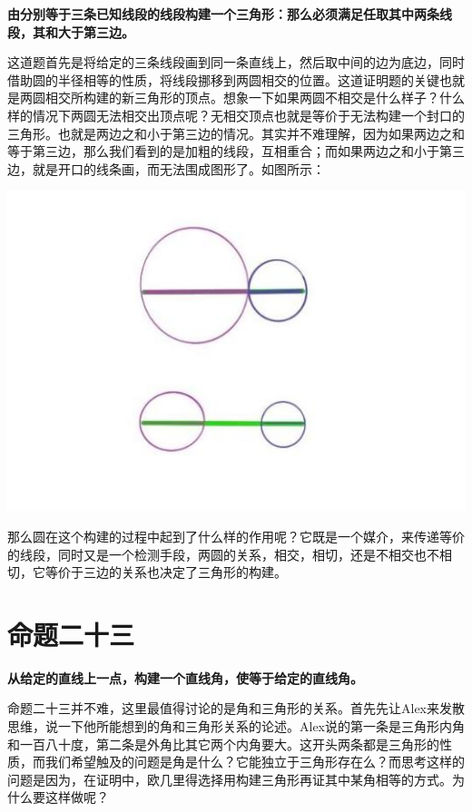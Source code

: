 \documentclass[
]{book}
\begin{document}
\textbf{由分别等于三条已知线段的线段构建一个三角形：那么必须满足任取其中两条线段，其和大于第三边。}

这道题首先是将给定的三条线段画到同一条直线上，然后取中间的边为底边，同时借助圆的半径相等的性质，将线段挪移到两圆相交的位置。这道证明题的关键也就是两圆相交所构建的新三角形的顶点。想象一下如果两圆不相交是什么样子？什么样的情况下两圆无法相交出顶点呢？无相交顶点也就是等价于无法构建一个封口的三角形。也就是两边之和小于第三边的情况。其实并不难理解，因为如果两边之和等于第三边，那么我们看到的是加粗的线段，互相重合；而如果两边之和小于第三边，就是开口的线条画，而无法围成图形了。如图所示：

\includegraphics[width=1\linewidth]{./image/12-prop22-image11}

那么圆在这个构建的过程中起到了什么样的作用呢？它既是一个媒介，来传递等价的线段，同时又是一个检测手段，两圆的关系，相交，相切，还是不相交也不相切，它等价于三边的关系也决定了三角形的构建。

\hypertarget{ux547dux9898ux4e8cux5341ux4e09}{%
\section{命题二十三}\label{ux547dux9898ux4e8cux5341ux4e09}}

\textbf{从给定的直线上一点，构建一个直线角，使等于给定的直线角。}

命题二十三并不难，这里最值得讨论的是角和三角形的关系。首先先让Alex来发散思维，说一下他所能想到的角和三角形关系的论述。Alex说的第一条是三角形内角和一百八十度，第二条是外角比其它两个内角要大。这开头两条都是三角形的性质，而我们希望触及的问题是角是什么？它能独立于三角形存在么？而思考这样的问题是因为，在证明中，欧几里得选择用构建三角形再证其中某角相等的方式。为什么要这样做呢？
\end{document}
